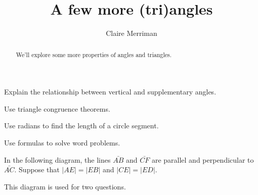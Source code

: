 \documentclass[noauthor,nooutcomes,handout]{ximera}
\title{A few more (tri)angles}
\author{Claire Merriman}
\begin{document}
\begin{abstract}
  We'll explore some more properties of angles and triangles.
\end{abstract}
\maketitle

\begin{listOutcomes}
\item Explain the relationship between vertical and supplementary angles.
\item Use triangle congruence theorems.
\item Use radians to find the length of a circle segment.
\item Use formulas to solve word problems.
\end{listOutcomes}






In the following diagram, the lines $\bar{AB}$ and $\bar{CF}$ are parallel and perpendicular to $\bar{AC}$. Suppose that $\left\vert AE\right\vert =\left\vert
EB\right\vert $ and $\left\vert CE\right\vert =\left\vert
ED\right\vert $.

This diagram is used for two questions.
\begin{center}
\end{center}
\end{document}
